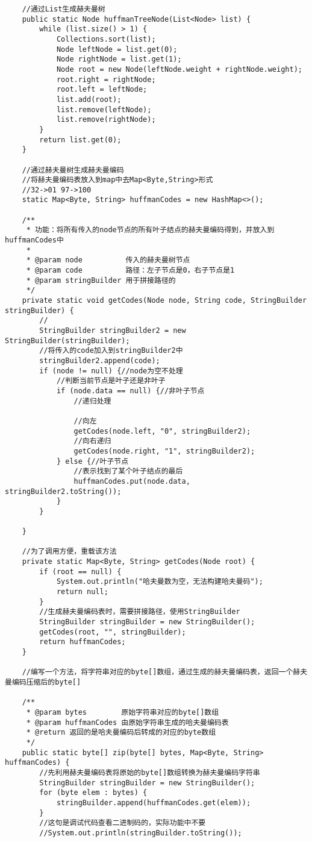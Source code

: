 \documentclass[a4paper]{report}
\begin{document}
\begin{lstlisting}
    //通过List生成赫夫曼树
    public static Node huffmanTreeNode(List<Node> list) {
        while (list.size() > 1) {
            Collections.sort(list);
            Node leftNode = list.get(0);
            Node rightNode = list.get(1);
            Node root = new Node(leftNode.weight + rightNode.weight);
            root.right = rightNode;
            root.left = leftNode;
            list.add(root);
            list.remove(leftNode);
            list.remove(rightNode);
        }
        return list.get(0);
    }

    //通过赫夫曼树生成赫夫曼编码
    //将赫夫曼编码表放入到map中去Map<Byte,String>形式
    //32->01 97->100
    static Map<Byte, String> huffmanCodes = new HashMap<>();

    /**
     * 功能：将所有传入的node节点的所有叶子结点的赫夫曼编码得到，并放入到huffmanCodes中
     *
     * @param node          传入的赫夫曼树节点
     * @param code          路径：左子节点是0，右子节点是1
     * @param stringBuilder 用于拼接路径的
     */
    private static void getCodes(Node node, String code, StringBuilder stringBuilder) {
        //
        StringBuilder stringBuilder2 = new StringBuilder(stringBuilder);
        //将传入的code加入到stringBuilder2中
        stringBuilder2.append(code);
        if (node != null) {//node为空不处理
            //判断当前节点是叶子还是非叶子
            if (node.data == null) {//非叶子节点
                //递归处理

                //向左
                getCodes(node.left, "0", stringBuilder2);
                //向右递归
                getCodes(node.right, "1", stringBuilder2);
            } else {//叶子节点
                //表示找到了某个叶子结点的最后
                huffmanCodes.put(node.data, stringBuilder2.toString());
            }
        }

    }

    //为了调用方便，重载该方法
    private static Map<Byte, String> getCodes(Node root) {
        if (root == null) {
            System.out.println("哈夫曼数为空，无法构建哈夫曼码");
            return null;
        }
        //生成赫夫曼编码表时，需要拼接路径，使用StringBuilder
        StringBuilder stringBuilder = new StringBuilder();
        getCodes(root, "", stringBuilder);
        return huffmanCodes;
    }

    //编写一个方法，将字符串对应的byte[]数组，通过生成的赫夫曼编码表，返回一个赫夫曼编码压缩后的byte[]

    /**
     * @param bytes        原始字符串对应的byte[]数组
     * @param huffmanCodes 由原始字符串生成的哈夫曼编码表
     * @return 返回的是哈夫曼编码后转成的对应的byte数组
     */
    public static byte[] zip(byte[] bytes, Map<Byte, String> huffmanCodes) {
        //先利用赫夫曼编码表将原始的byte[]数组转换为赫夫曼编码字符串
        StringBuilder stringBuilder = new StringBuilder();
        for (byte elem : bytes) {
            stringBuilder.append(huffmanCodes.get(elem));
        }
        //这句是调试代码查看二进制码的，实际功能中不要
        //System.out.println(stringBuilder.toString());


\end{lstlisting}
\end{document}
